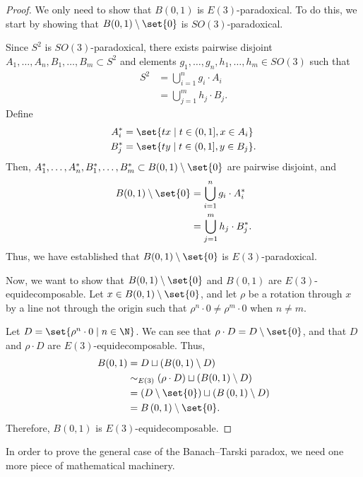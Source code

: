 \begin{proof}
  We only need to show that $B(0,1)$ is $E(3)$-paradoxical. To do this, we start by showing that $B(0,1)\setminus \set{0}$ is $SO(3)$-paradoxical.\newline

  Since $S^{2}$ is $SO(3)$-paradoxical, there exists pairwise disjoint $A_1,\dots,A_n,B_1,\dots,B_m\subset S^2$ and elements $g_1,\dots,g_n,h_1,\dots,h_m\in SO(3)$ such that
  \begin{align*}
    S^{2} &= \bigcup_{i=1}^{n}g_i\cdot A_i\\
          &= \bigcup_{j=1}^{m}h_j\cdot B_j.
  \end{align*}
  Define
  \begin{align*}
    A_i^{\ast} &= \set{tx\mid t\in (0,1], x\in A_i}\\
    B_j^{\ast} &= \set{ty\mid t\in (0,1], y\in B_j}.
  \end{align*}
  Then, $A_1^{\ast},\dots,A_n^{\ast},B_1^{\ast},\dots,B_m^{\ast}\subset B(0,1)\setminus \set{0}$ are pairwise disjoint, and
  \begin{align*}
    B(0,1)\setminus \set{0} &= \bigcup_{i=1}^{n}g_i\cdot A_i^{\ast}\\
                            &= \bigcup_{j=1}^{m}h_j\cdot B_j^{\ast}.
  \end{align*}
  Thus, we have established that $B(0,1)\setminus \set{0}$ is $E(3)$-paradoxical.\newline

  Now, we want to show that $B(0,1)\setminus \set{0}$ and $B(0,1)$ are $E(3)$-equidecomposable. Let $x\in B(0,1)\setminus \set{0}$, and let $\rho$ be a rotation through $x$ by a line not through the origin such that $\rho^{n}\cdot 0\neq \rho^{m}\cdot 0$ when $n\neq m$.\newline

  Let $D = \set{\rho^{n}\cdot 0\mid n\in \N}$. We can see that $\rho\cdot D = D\setminus \set{0}$, and that $D$ and $\rho\cdot D$ are $E(3)$-equidecomposable. Thus,
  \begin{align*}
    B(0,1) &= D\sqcup \left(B(0,1)\setminus D\right)\\
           &\sim_{E(3)}\left(\rho\cdot D\right) \sqcup \left(B(0,1)\setminus D\right)\\
           &= \left(D\setminus \set{0}\right)\sqcup \left(B\left(0,1\right)\setminus D\right)\\
           &= B\left(0,1\right)\setminus \set{0}.
  \end{align*}
  Therefore, $B(0,1)$ is $E(3)$-equidecomposable.
\end{proof}
In order to prove the general case of the Banach--Tarski paradox, we need one more piece of mathematical machinery.\newline

